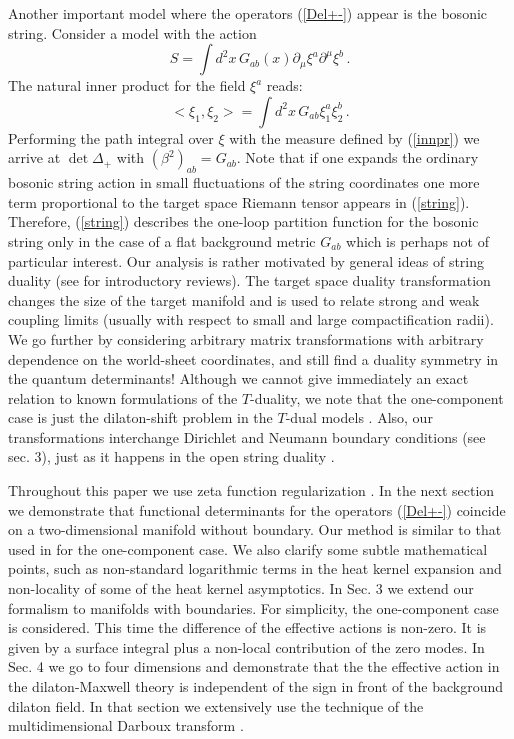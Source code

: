 \documentclass[a4paper,12pt]{article}
\begin{document}
Another important model where the operators (\ref{Del+-})
appear is the bosonic string.
Consider a model with the action 
\begin{equation}
S=\int d^2x \, G_{ab}(x) \partial_\mu \xi^a \partial^\mu \xi^b \,.
\label{string}
\end{equation}
The natural inner product for the field $\xi^a$ reads:
\begin{equation}
<\xi_{1},\xi_2>=\int d^2 x\, G_{ab}\xi^a_1\xi^b_2 \label{innpr}\,.
\end{equation}
Performing the path integral over $\xi$ with the measure
defined by (\ref{innpr}) we arrive at $\det \Delta_+$ 
with $(\beta^2)_{ab}=G_{ab}$. 
Note that if one expands the ordinary bosonic string
action in small fluctuations of the string coordinates
one more term proportional to the target space Riemann tensor
appears in (\ref{string}). Therefore, (\ref{string}) describes
the one-loop partition function for the bosonic string only
in the case of a flat background metric $G_{ab}$ which is perhaps
not of particular interest. Our analysis is rather motivated
by general ideas of string duality 
(see \cite{Giveon:1994fu,Alvarez:1995dn} for introductory reviews).
The target space duality transformation changes the size of the
target manifold and is used to relate strong and weak
coupling limits (usually with respect to small and large
compactification radii). We go further by considering 
arbitrary matrix transformations with arbitrary dependence
on the world-sheet coordinates, and still find a duality
symmetry in the quantum determinants! Although we cannot
give immediately an exact relation to known formulations of the
$T$-duality, we note that
the one-component case is just the dilaton-shift
problem in the $T$-dual models \cite{SchwarzZeitlin93}.
Also, our transformations interchange Dirichlet and
Neumann boundary conditions (see sec. 3), just as it
happens in the open string duality
\cite{Horava:1989ga,DLP89,Green:1991et,Bianchi:1992eu,
Dorn:1996an,Forste:1996hy}.


Throughout this paper we use zeta function regularization
\cite{DowkerCr76,Hawking77}. In the next section we demonstrate
that functional determinants for the operators (\ref{Del+-})
coincide on a two-dimensional manifold without boundary. Our 
method is similar to that used in \cite{SchwarzZeitlin93}
for the one-component case. We also clarify some subtle
mathematical points, such as non-standard logarithmic
terms in the heat kernel expansion and non-locality of some
of the heat kernel asymptotics. In Sec. 3 we extend
our formalism to manifolds with boundaries. For simplicity,
the one-component case is considered. This time the difference of the
effective actions is non-zero. It is given by a
surface integral plus a non-local contribution of the zero
modes. In Sec. 4 we go to four dimensions and demonstrate that the
the effective action in the dilaton-Maxwell
theory is independent of the sign in front of the background dilaton field.
In that section we extensively use the technique of the
multidimensional Darboux transform \cite{ABI}.
\end{document}
